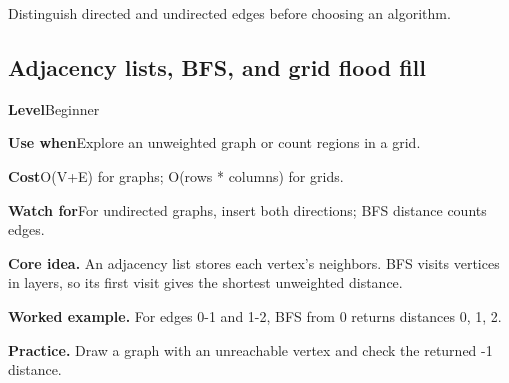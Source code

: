 \documentclass[10pt,letterpaper]{article}
\newcommand{\entrylabel}[1]{\textcolor{accent}{\bfseries #1}}
\begin{document}
\begin{guidebox}Distinguish directed and undirected edges before choosing an algorithm.\end{guidebox}
\subsection{Adjacency lists, BFS, and grid flood fill}
\begin{guidebox}\small
\entrylabel{Level}\quad Beginner\par
\entrylabel{Use when}\quad Explore an unweighted graph or count regions in a grid.\par
\entrylabel{Cost}\quad O(V+E) for graphs; O(rows * columns) for grids.\par
\entrylabel{Watch for}\quad For undirected graphs, insert both directions; BFS distance counts edges.\par
\end{guidebox}
\noindent\textbf{Core idea.} An adjacency list stores each vertex's neighbors. BFS visits vertices in layers, so its first visit gives the shortest unweighted distance.\par
\noindent\textbf{Worked example.} For edges 0-1 and 1-2, BFS from 0 returns distances 0, 1, 2.\par
\noindent\textbf{Practice.} Draw a graph with an unreachable vertex and check the returned -1 distance.\par
\end{document}
